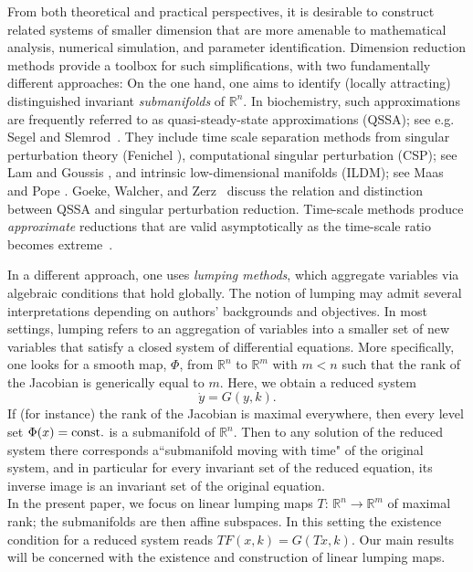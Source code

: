 \documentclass{article}
\begin{document}
From both theoretical and practical perspectives, 
it is desirable to construct related systems of smaller dimension that are more amenable to 
mathematical analysis, numerical simulation, and parameter identification. Dimension reduction 
methods provide a toolbox for such simplifications, with two fundamentally different 
approaches: On the one hand, one aims to identify (locally attracting) distinguished invariant {\it submanifolds} of $\mathbb{R}^n$. In biochemistry, such approximations are frequently referred to as quasi-steady-state approximations (QSSA); see e.g. Segel and Slemrod~\cite{SegelSlemrod1989,Shoffner}. They include time scale separation methods from singular perturbation theory (Fenichel \cite{Fenichel1979}),
computational singular perturbation (CSP); see Lam and Goussis \cite{LamGoussis1994}, and intrinsic low-dimensional 
manifolds (ILDM); see Maas and Pope \cite{MaasPope1992}.
Goeke, Walcher, and Zerz~\cite{GWZ2015} discuss the relation and distinction between QSSA and singular 
perturbation reduction. Time-scale methods produce \emph{approximate} reductions that are valid asymptotically 
as the time-scale ratio becomes extreme~\cite{Fenichel1979, LamGoussis1994, MaasPope1992}.

In a different approach, one uses \emph{lumping methods}, which aggregate variables 
via algebraic conditions that hold globally. The notion of lumping may admit several interpretations depending on authors' backgrounds and 
objectives. In most settings, lumping refers to an aggregation of variables into a smaller 
set of new variables that satisfy a closed system of differential equations. More specifically, one looks for a smooth map, $\Phi$, from $\mathbb{R}^n$ to $\mathbb{R}^m$ with $m < n$ such that the rank of the Jacobian is generically equal to $m$. Here, we obtain a reduced system
\begin{equation}
\dot{y} =  G(y,k).
\end{equation}
If (for instance) the rank of the Jacobian is maximal everywhere, then every level set $\Phi(x)={\rm const.}$ is a submanifold of $\mathbb R^n$. Then to any solution of the reduced system there corresponds a``submanifold moving with time" of the original system, and in particular for every invariant set of the reduced equation, its inverse image is an invariant set of the original equation. \\
In the present paper, we focus on linear lumping maps $T:\, \mathbb R^n\to\mathbb R^m$ of maximal rank; the submanifolds are then affine subspaces. In this setting the existence condition for 
a reduced system reads
$TF(x,k)=G(Tx,k)$. Our main results will be concerned with the existence and construction of linear lumping maps.
\end{document}
